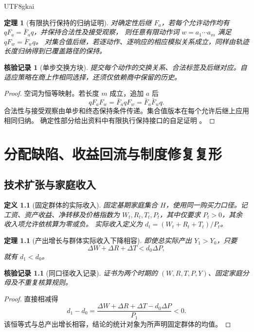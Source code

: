 \documentclass[12pt,a4paper,openany]{report}
\newtheorem{definition}{定义}[chapter]
\newtheorem{theorem}{定理}[chapter]
\newtheorem{Certificate}{核验记录}[chapter]
\numberwithin{equation}{chapter}
\begin{document}
\begin{CJK*}{UTF8}{gkai}
\begin{theorem}[有限执行保持的归纳证明]
\label{thm:word-preservation}
对确定性后继 $F_a$，若每个允许动作均有 $qF_a=\bar F_aq$，并保持合法性及接受观察，
则任意有限动作词 $w=a_1\cdots a_m$ 满足 $qF_w=\bar F_wq$。
对集合值后继，若逐动作、逐响应的相应模拟关系成立，同样由轨迹长度归纳得到已覆盖路径的保持。
\end{theorem}
\begin{Certificate}[单步交换方块]
提交每个动作的交换关系、合法标签及后继对应。自适应策略在商上作相同选择，还须仅依赖商中保留的历史。
\end{Certificate}
\begin{proof}
空词为恒等映射。若长度 $m$ 成立，追加 $a$ 后
\[
 qF_aF_w=\bar F_aqF_w=\bar F_a\bar F_wq.
\]
合法性与接受观察由单步和终态保持条件传递。集合值版本在每个允许后继上应用相同归纳。
确定性部分给出资料中有限执行保持接口的自足证明
\cite[《规范竞技、多元评价与共同权利底线》，定理“商上有限执行保持：公理降级”]{SourceCompetition}。
\end{proof}

\chapter{分配缺陷、收益回流与制度修复复形}
\label{chap:distribution}

\section{技术扩张与家庭收入}

\begin{definition}[固定群体的实际收入]
固定基期家庭集合 $H$，使用同一购买力口径。记工资、资产收益、净转移及价格指数为
$W_t,R_t,T_t,P_t$，其中仅要求 $P_t>0$，其余收入项允许依核算为零或负。
实际收入定义为 $d_t=(W_t+R_t+T_t)/P_t$。
\end{definition}

\begin{theorem}[产出增长与群体实际收入下降相容]
\label{thm:income}
即使总实际产出 $Y_1>Y_0$，只要
\[
 \Delta W+\Delta R+\Delta T<d_0\Delta P,
\]
就有 $d_1<d_0$。
\end{theorem}
\begin{Certificate}[同口径收入记录]
证书为两个时期的 $(W,R,T,P,Y)$、固定家庭分母及不重复核算规则。
\end{Certificate}
\begin{proof}
直接相减得
\[
 d_1-d_0=\frac{\Delta W+\Delta R+\Delta T-d_0\Delta P}{P_1}<0.
\]
该恒等式与总产出增长相容，结论的统计对象为所声明固定群体的均值。
\end{proof}


\end{CJK*}
\end{document}
